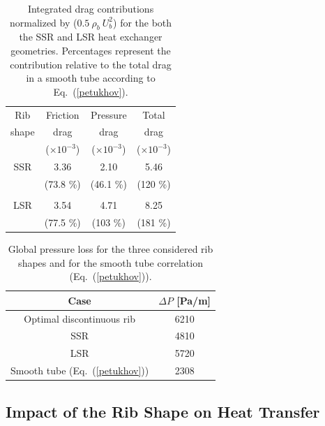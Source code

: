 \begin{table}
\small
\centering
\begin{tabular}{cccc}
   Rib & Friction & Pressure & Total \\
   shape & drag  & drag & drag \\
         & ($\times 10^{-3}$) & ($\times 10^{-3}$) & ($\times 10^{-3}$) \\
  \hline
  SSR & 3.36 & 2.10 & 5.46 \\
      & (73.8 \%) & (46.1 \%) & (120 \%) \\
  \\
  LSR & 3.54 & 4.71 & 8.25 \\
      & (77.5 \%) & (103 \%) & (181 \%) \\
  \hline
\end{tabular}
\caption{Integrated drag contributions normalized by ($0.5 ~ \rho_b ~ U_b^2$) for the both the SSR and LSR heat exchanger geometries. Percentages represent the contribution relative to the total drag in a smooth tube according to Eq.~(\ref{petukhov}).}
\label{tab_drags_compare}
\end{table}

\begin{table}
\small
\centering
\begin{tabular}{cc}
  Case & $\Delta P$ [Pa/m] \\
  \hline
  Optimal discontinuous rib & 6210 \\
  SSR & 4810 \\
  LSR & 5720 \\
  Smooth tube (Eq.~(\ref{petukhov})) & 2308 \\
  \hline
\end{tabular}
\caption{Global pressure loss for the three considered rib shapes and for the smooth tube correlation (Eq.~(\ref{petukhov})).}
\label{tab_pressureloss_compare}
\end{table}

\subsection{Impact of the Rib Shape on Heat Transfer}
\label{sec:swirl_impact}

